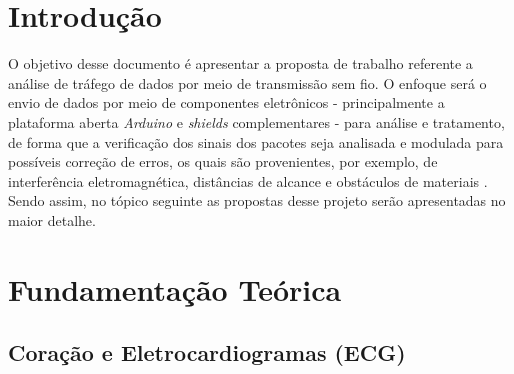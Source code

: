 \documentclass[conference]{IEEEtran}
\begin{document}




\maketitle






%
\IEEEpeerreviewmaketitle



\section{Introdução}
O objetivo desse documento \'e apresentar a proposta de trabalho referente a an\'alise de tr\'afego de dados por meio de transmiss\~ao sem fio.
O enfoque ser\'a o envio de dados por meio de componentes eletr\^onicos - principalmente a plataforma aberta \textit{Arduino} e \textit{shields} complementares - para an\'alise e tratamento, de forma que a verifica\c{c}\~ao dos sinais dos pacotes seja analisada e modulada para poss\'iveis corre\c{c}\~ao de erros, os quais s\~ao provenientes, por exemplo, de interfer\^encia eletromagn\'etica, dist\^ancias de alcance e obst\'aculos de materiais \cite{ciscoRfProblems}.
Sendo assim, no t\'opico seguinte as propostas desse projeto ser\~ao apresentadas no maior detalhe.

 

\section{Fundamentação Teórica}

\subsection{Coração e Eletrocardiogramas (ECG)}
\end{document}
